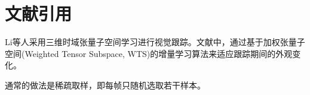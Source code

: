 \section{文献引用}

Li等\cite{li2007robust}人采用三维时域张量子空间学习进行视觉跟踪。文献中，通过基于加权张量子空间(Weighted Tensor Subspace, WTS)的增量学习算法来适应跟踪期间的外观变化。

通常的做法是稀疏取样，即每帧只随机选取若干样本\cite{Zhang2012Real,kalal2012tracking,babenko2011robust,saffari2009line,hare2016struck}。

